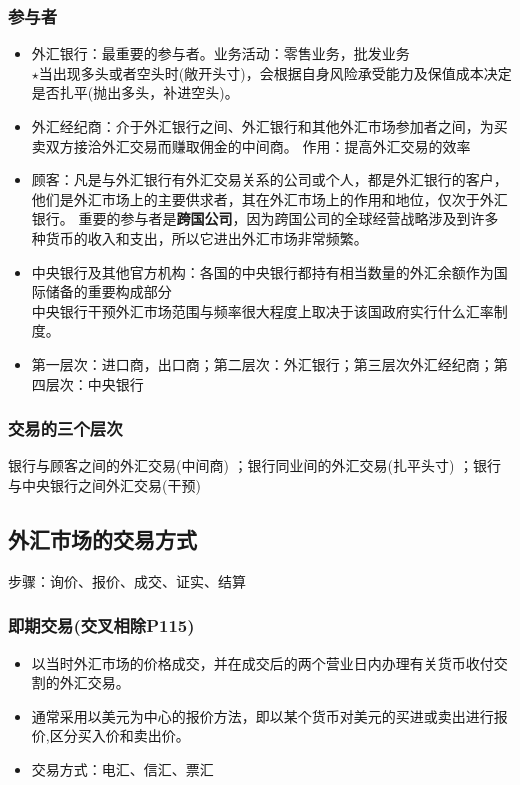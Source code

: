 \documentclass{article}
\begin{document}
\subsubsection*{参与者}
\begin{itemize}
    \item 外汇银行：最重要的参与者。业务活动：零售业务，批发业务\\
    {\color{red}$\star$}当出现多头或者空头时(敞开头寸)，会根据自身风险承受能力及保值成本决定是否扎平(抛出多头，补进空头)。
    \item 外汇经纪商：介于外汇银行之间、外汇银行和其他外汇市场参加者之间，为买卖双方接洽外汇交易而赚取佣金的中间商。
    作用：提高外汇交易的效率
    \item 顾客：凡是与外汇银行有外汇交易关系的公司或个人，都是外汇银行的客户，他们是外汇市场上的主要供求者，其在外汇市场上的作用和地位，仅次于外汇银行。
    重要的参与者是\textbf{跨国公司}，因为跨国公司的全球经营战略涉及到许多种货币的收入和支出，所以它进出外汇市场非常频繁。
    \item 中央银行及其他官方机构：各国的中央银行都持有相当数量的外汇余额作为国际储备的重要构成部分\\
    中央银行干预外汇市场范围与频率很大程度上取决于该国政府实行什么汇率制度。
    \item 第一层次：进口商，出口商；第二层次：外汇银行；第三层次外汇经纪商；第四层次：中央银行
\end{itemize}
\subsubsection*{交易的三个层次}
银行与顾客之间的外汇交易(中间商)
；银行同业间的外汇交易(扎平头寸)
；银行与中央银行之间外汇交易(干预)
\subsection*{外汇市场的交易方式}
步骤：询价、报价、成交、证实、结算
\subsubsection*{即期交易(交叉相除P115)}
\begin{itemize}
    \item 以当时外汇市场的价格成交，并在成交后的两个营业日内办理有关货币收付交割的外汇交易。
    \item 通常采用以美元为中心的报价方法，即以某个货币对美元的买进或卖出进行报价,区分买入价和卖出价。
    \item 交易方式：电汇、信汇、票汇
\end{itemize}
\end{document}
